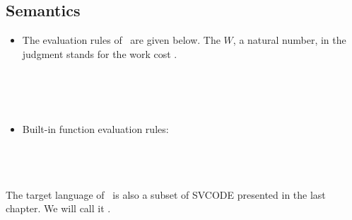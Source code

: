\subsection{Semantics}


\begin{itemize}
\item The evaluation rules of \fmsnesl \ are  given below. The $W$, a natural number, in the judgment stands for the work cost . \\

	
	
	\\[2ex]	
	\\[2ex]
	
	\\
	
\item Built-in function evaluation rules: \\

	
	 \\[2ex]
	
	
\end{itemize}


\section{\fmsvcode}
The target language of \fmsnesl \  is also a subset of SVCODE presented in the last chapter. 
We will call it  \fmsvcode.

